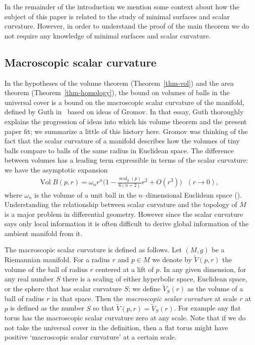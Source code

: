 \documentclass[12pt]{amsart}
\numberwithin{equation}{section}
\begin{document}
In the remainder of the introduction we mention some context about how the subject of this paper is related to the study of minimal surfaces and scalar curvature.  However, in order to understand the proof of the main theorem we do not require any knowledge of minimal surfaces and scalar curvature.

\subsection{Macroscopic scalar curvature} 

In the hypotheses of the volume theorem (Theorem~\ref{thm-vol}) and the area theorem (Theorem~\ref{thm-homology}), the bound on volumes of balls in the universal cover is a bound on the macroscopic scalar curvature of the manifold, defined by Guth in~\cite{Guth10'} based on ideas of Gromov.  In that essay, Guth thoroughly explains the progression of ideas into which his volume theorem and the present paper fit; we summarize a little of this history here.  Gromov was thinking of the fact that the scalar curvature of a manifold describes how the volumes of tiny balls compare to balls of the same radius in Euclidean space.  The difference between volumes has a leading term expressible in terms of the scalar curvature: we have the asymptotic expansion 
\begin{align*}
 \operatorname{Vol} B(p,r)=\omega_n
 r^{n}\Big(1-\frac{{\mathop{\mathrm{scal}} \nolimits}_g(p)}{6(n+2)}r^2+O(r^3)\Big) \ \ \ (r\to 0),
 \end{align*}where $\omega_n$ is the volume of a unit ball
 in the $n$--dimensional Euclidean space (\cite[Theorem 3.98]{Gallot04}).  Understanding the relationship between scalar curvature and the topology of $M$ is a major problem in differential geometry. However since the scalar curvature says only local information it is often difficult to derive global information of the ambient manifold from it.
 
 The macroscopic scalar curvature is defined as follows.  Let $(M,g)$ be a Riemannian manifold. For a radius $r$ and $p\in M$ we
denote by $\widetilde{V}(p,r)$ the volume of the ball of radius $r$
centered at a lift of $p$. In any given dimension, for any real number $S$ there is a scaling of either hyperbolic space, Euclidean space, or the sphere that has scalar curvature $S$; we define $\widetilde{V}_S(r)$ as the volume of a ball of radius $r$ in that space. Then the \emph{macroscopic scalar curvature} at scale $r$ at $p$ is defined as the number $S$ so that
$\widetilde{V}(p,r)=\widetilde{V}_S(r)$. For example any flat torus has
the macroscopic scalar curvature zero at any scale. Note that if we do
not take the universal cover in the definition, then a flat torus might
have positive `macroscopic scalar curvature' at a certain scale.
\end{document}
